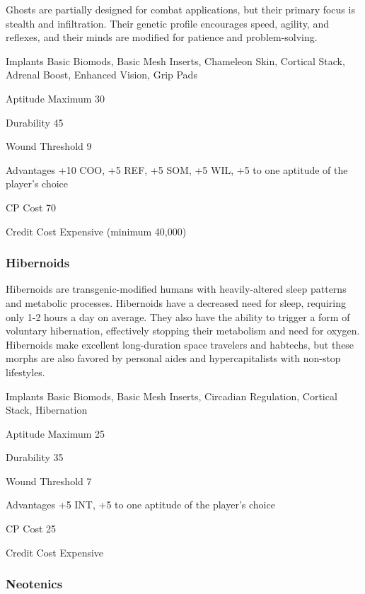 Ghosts are partially designed for combat applications, but their primary focus is stealth and infiltration. Their genetic profile encourages speed, agility, and reflexes, and their minds are modified for patience and problem-solving. 

\begin{description*} \item[Implants] Basic Biomods, Basic Mesh Inserts, Chameleon Skin, Cortical Stack, Adrenal Boost, Enhanced Vision, Grip Pads \item[Aptitude Maximum] 30 \item[Durability] 45 \item[Wound Threshold] 9 \item[Advantages] +10 COO, +5 REF, +5 SOM, +5 WIL, +5 to one aptitude of the player’s choice \item[CP Cost] 70 \item[Credit Cost] Expensive (minimum 40,000) \end{description*} 

\subsubsection{Hibernoids} \label{sec:starting-hibernoids} 

Hibernoids are transgenic-modified humans with heavily-altered sleep patterns and metabolic processes. Hibernoids have a decreased need for sleep, requiring only 1-2 hours a day on average. They also have the ability to trigger a form of voluntary hibernation, effectively stopping their metabolism and need for oxygen. Hibernoids make excellent long-duration space travelers and habtechs, but these morphs are also favored by personal aides and hypercapitalists with non-stop lifestyles. 

\begin{description*} \item[Implants] Basic Biomods, Basic Mesh Inserts, Circadian Regulation, Cortical Stack, Hibernation \item[Aptitude Maximum] 25 \item[Durability] 35 \item[Wound Threshold] 7 \item[Advantages] +5 INT, +5 to one aptitude of the player’s choice \item[CP Cost] 25 \item[Credit Cost] Expensive \end{description*} 

\subsubsection{Neotenics} \label{sec:starting-neonetics} 

